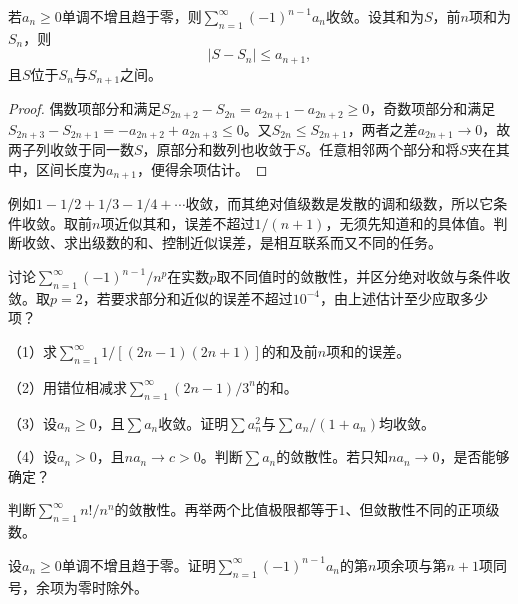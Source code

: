 \begin{theorem}[交错级数判别法]
若\(a_n\ge0\)单调不增且趋于零，则\(\sum_{n=1}^{\infty}(-1)^{n-1}a_n\)收敛。设其和为\(S\)，前\(n\)项和为\(S_n\)，则
\begin{equation}\label{eq:analysis-alternating-error}
 |S-S_n|\le a_{n+1},
\end{equation}
且\(S\)位于\(S_n\)与\(S_{n+1}\)之间。
\end{theorem}

\begin{proof}
偶数项部分和满足\(S_{2n+2}-S_{2n}=a_{2n+1}-a_{2n+2}\ge0\)，奇数项部分和满足\(S_{2n+3}-S_{2n+1}=-a_{2n+2}+a_{2n+3}\le0\)。又\(S_{2n}\le S_{2n+1}\)，两者之差\(a_{2n+1}\to0\)，故两子列收敛于同一数\(S\)，原部分和数列也收敛于\(S\)。任意相邻两个部分和将\(S\)夹在其中，区间长度为\(a_{n+1}\)，便得余项估计。
\end{proof}

例如\(1-1/2+1/3-1/4+\cdots\)收敛，而其绝对值级数是发散的调和级数，所以它条件收敛。取前\(n\)项近似其和，误差不超过\(1/(n+1)\)，无须先知道和的具体值。判断收敛、求出级数的和、控制近似误差，是相互联系而又不同的任务。

\begin{example}
讨论\(\sum_{n=1}^{\infty}(-1)^{n-1}/n^p\)在实数\(p\)取不同值时的敛散性，并区分绝对收敛与条件收敛。取\(p=2\)，若要求部分和近似的误差不超过\(10^{-4}\)，由上述估计至少应取多少项？
\end{example}

\begin{exercise}[本节习题]
\mbox{}\par\nobreak

（1）求\(\sum_{n=1}^{\infty}1/[(2n-1)(2n+1)]\)的和及前\(n\)项和的误差。

（2）用错位相减求\(\sum_{n=1}^{\infty}(2n-1)/3^n\)的和。

（3）设\(a_n\ge0\)，且\(\sum a_n\)收敛。证明\(\sum a_n^2\)与\(\sum a_n/(1+a_n)\)均收敛。

（4）设\(a_n>0\)，且\(na_n\to c>0\)。判断\(\sum a_n\)的敛散性。若只知\(na_n\to0\)，是否能够确定？

判断\(\sum_{n=1}^{\infty}n!/n^n\)的敛散性。再举两个比值极限都等于\(1\)、但敛散性不同的正项级数。

设\(a_n\ge0\)单调不增且趋于零。证明\(\sum_{n=1}^{\infty}(-1)^{n-1}a_n\)的第\(n\)项余项与第\(n+1\)项同号，余项为零时除外。
\end{exercise}
